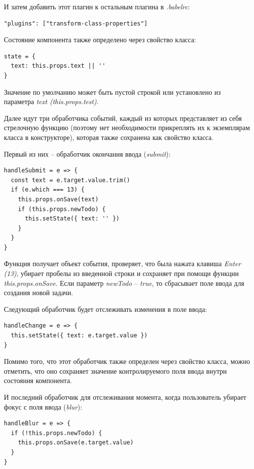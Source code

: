 И затем добавить этот плагин к остальным плагина в \textit{.babelrc}:

\begin{lstlisting}
"plugins": ["transform-class-properties"]
\end{lstlisting}

Состояние компонента также определено через свойство класса:

\begin{lstlisting}
state = {
  text: this.props.text || ''
}
\end{lstlisting}

Значение по умолчанию может быть пустой строкой или установлено из параметра \textit{text (this.props.test)}.

Далее идут три обработчика событий, каждый из которых представляет из себя стрелочную функцию (поэтому нет необходимости прикреплять их к экземплярам класса в конструкторе), которая также сохранена как свойство класса. 

Первый из них -- обработчик окончания ввода (\textit{submit}):

\begin{lstlisting}
handleSubmit = e => {
  const text = e.target.value.trim()
  if (e.which === 13) {
    this.props.onSave(text)
    if (this.props.newTodo) {
      this.setState({ text: '' })
    }
  }
}
\end{lstlisting}

Функция получает объект события, проверяет, что была нажата клавиша \textit{Enter (13)}, убирает пробелы из введенной строки и сохраняет при помощи функции \textit{this.props.onSave}. Если параметр \textit{newTodo} -- \textit{true}, то сбрасывает поле ввода для создания новой задачи.

Следующий обработчик будет отслеживать изменения в поле ввода:

\begin{lstlisting}
handleChange = e => {
  this.setState({ text: e.target.value })
}
\end{lstlisting}

Помимо того, что этот обработчик также определен через свойство класса, можно отметить, что оно сохраняет значение контролируемого поля ввода внутри состояния компонента.

И последний обработчик для отслеживания момента, когда пользователь убирает фокус с поля ввода (\textit{blur}):

\begin{lstlisting}
handleBlur = e => {
  if (!this.props.newTodo) {
    this.props.onSave(e.target.value)
  }
}
\end{lstlisting}

